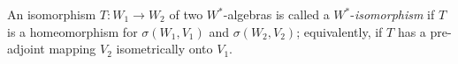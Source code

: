 An isomorphism $T : W_1 \rightarrow W_2$ of two $W^*$-algebras is called a $W^*$-\textit{isomorphism} if $T$ is a homeomorphism for $\sigma(W_1, V_1)$ and $\sigma(W_2, V_2)$; equivalently, if $T$ has a pre-adjoint mapping $V_2$ isometrically onto $V_1$.
